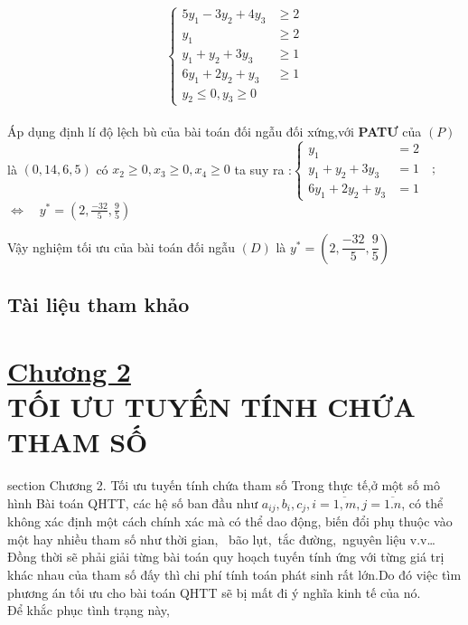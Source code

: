 \documentclass{article}
\begin{document}
\[\left\{\begin{aligned}
5y_1-3y_2+4y_3&\geq2 \\
y_1&\geq2 \\
y_1+y_2+3y_3&\geq1 \\
6y_1+2y_2+y_3&\geq1 \\
y_2\leq 0,y_3\geq 0
\end{aligned}\right.\]\\

Áp dụng định lí độ lệch bù của bài toán đối ngẫu đối xứng,với \textbf{PATƯ} của $\left(P\right)$ là 
$\left(0,14,6,5\right)$ có $x_2\geq 0,x_3\geq 0,x_4\geq 0$ ta suy ra :$\left\{\begin{aligned} 
y_1&=2 \\
y_1+y_2+3y_3&=1\quad;\\
6y_1+2y_2+y_3&=1 
\end{aligned}\right.$\\

$\Longleftrightarrow \quad y^*=\left(2,\frac{-32}{5},\frac{9}{5}\right)$

Vậy nghiệm tối ưu của bài toán đối ngẫu $\left(D\right)$ là $y^*=\left(2,\dfrac{-32}{5},\dfrac{9}{5}\right)$

\subsection{Tài liệu tham khảo}


\cleardoublepage
\section*{\uline{Chương 2}\\
\centering
\vspace{0.5cm}
 TỐI ƯU TUYẾN TÍNH CHỨA THAM SỐ}
  {section} {Chương 2. Tối ưu tuyến tính chứa tham số}
 Trong thực tế,ở một số mô hình Bài toán QHTT, 
 các hệ số ban đầu như
  $a_{ij},b_i,c_j,i=\overline{1,m},j=\overline{1.n}$,
  có thể không xác định một cách chính xác mà có thể dao động,
   biến đổi phụ thuộc vào một hay nhiều tham số như thời gian,
\ bão lụt,\ tắc đường,\ nguyên liệu v.v\ldots Đồng thời sẽ phải giải từng bài 
toán quy hoạch  tuyến tính ứng với từng giá trị khác nhau của tham số đấy thì
chi phí tính toán phát sinh rất lớn.Do đó việc tìm phương án tối ưu
 cho bài toán QHTT sẽ bị mất đi ý nghĩa kinh tế của nó.\\
 \qquad Để khắc phục tình trạng này,
\end{document}
